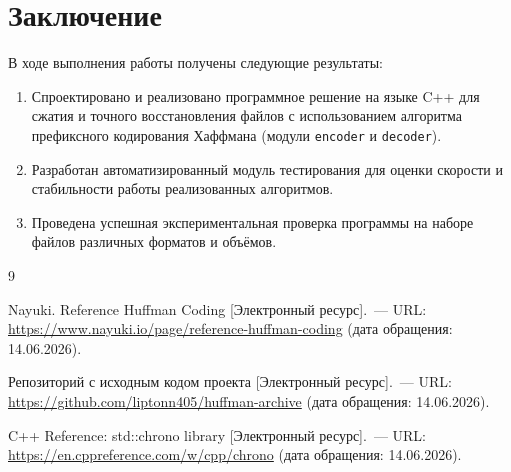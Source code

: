 \documentclass[a4paper]{article}
\begin{document}
\section{Заключение}

В ходе выполнения работы получены следующие результаты:

\begin{enumerate}
    \item Спроектировано и реализовано программное решение на языке C++ для сжатия и точного
    восстановления файлов с использованием алгоритма префиксного кодирования Хаффмана
    (модули \texttt{encoder} и \texttt{decoder}).

    \item Разработан автоматизированный модуль тестирования для оценки скорости и стабильности
    работы реализованных алгоритмов.

    \item Проведена успешная экспериментальная проверка программы на наборе файлов различных
    форматов и объёмов.
\end{enumerate}

\begin{thebibliography}{9}

Nayuki. Reference Huffman Coding [Электронный ресурс].~---
URL: \url{https://www.nayuki.io/page/reference-huffman-coding}
(дата обращения: 14.06.2026).

Репозиторий с исходным кодом проекта [Электронный ресурс].~---
URL: \url{https://github.com/liptonn405/huffman-archive}
(дата обращения: 14.06.2026).

C++ Reference: std::chrono library [Электронный ресурс].~---
URL: \url{https://en.cppreference.com/w/cpp/chrono}
(дата обращения: 14.06.2026).

\end{thebibliography}
\end{document}
